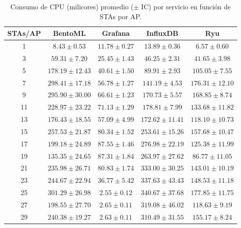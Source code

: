 \begin{table}[ht!]
\centering
\begin{tabular}{|c|c|c|c|c|}
\hline
\textbf{STAs/AP} & \textbf{BentoML} & \textbf{Grafana} & \textbf{InfluxDB} & \textbf{Ryu} \\
\hline
1  & $8.43 \pm 0.53$   & $11.78 \pm 0.27$ & $13.89 \pm 0.36$ & $6.57 \pm 0.60$ \\ \hline
3  & $59.31 \pm 7.20$  & $25.45 \pm 1.43$ & $46.25 \pm 2.31$ & $41.65 \pm 3.98$ \\ \hline
5  & $178.19 \pm 12.43$& $40.61 \pm 1.50$ & $89.91 \pm 2.93$ & $105.05 \pm 7.55$ \\ \hline
7  & $298.41 \pm 17.18$& $56.78 \pm 1.27$ & $141.19 \pm 4.53$& $176.31 \pm 12.10$ \\ \hline
9  & $295.90 \pm 30.00$& $66.61 \pm 1.23$ & $170.73 \pm 5.57$& $168.85 \pm 8.74$ \\ \hline
11 & $228.97 \pm 23.22$& $71.13 \pm 1.29$ & $178.81 \pm 7.99$& $133.68 \pm 11.82$ \\ \hline
13 & $176.43 \pm 18.55$& $57.09 \pm 4.99$ & $172.62 \pm 11.41$& $118.10 \pm 10.73$ \\ \hline
15 & $257.53 \pm 21.87$& $80.34 \pm 1.52$ & $253.61 \pm 15.26$& $157.68 \pm 10.47$ \\ \hline
17 & $199.18 \pm 24.89$& $87.55 \pm 1.46$ & $276.98 \pm 22.19$& $125.38 \pm 11.99$ \\ \hline
19 & $135.35 \pm 24.65$& $87.31 \pm 1.84$ & $263.97 \pm 27.62$& $86.77 \pm 11.05$ \\ \hline
21 & $235.98 \pm 26.71$& $80.83 \pm 1.74$ & $333.00 \pm 30.25$& $143.01 \pm 10.19$ \\ \hline
23 & $244.67 \pm 22.94$& $36.77 \pm 5.42$ & $337.63 \pm 43.43$& $148.53 \pm 11.18$ \\ \hline
25 & $301.29 \pm 26.98$& $2.55 \pm 0.12$  & $340.67 \pm 37.68$& $177.85 \pm 11.75$ \\ \hline
27 & $198.55 \pm 27.70$& $2.65 \pm 0.11$  & $319.08 \pm 46.02$& $118.63 \pm 9.19$ \\ \hline
29 & $240.38 \pm 19.27$& $2.63 \pm 0.11$  & $310.49 \pm 31.55$& $155.17 \pm 8.24$ \\
\hline
\end{tabular}
\caption{Consumo de CPU (milicores) promedio ($\pm$ IC) por servicio en función de STAs por AP.}
\label{tab:cpu-usage}
\end{table}




